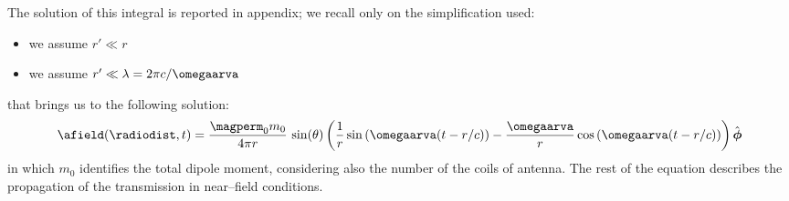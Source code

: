 The solution of this integral is reported in appendix; we recall only on the simplification used:
\begin{itemize}
\item we assume $r' \ll r$
\item we assume $r' \ll \lambda = 2\pi c/\omegaarva$
\end{itemize}
that brings us to the following solution:
\begin{equation}
\label{eq:soluzioneint}
\afield(\radiodist,t) = \dfrac{\magperm_0 m_0}{4\pi r}\,\sin(\theta)\left( \dfrac{1}{r} \sin\left(\omegaarva(t-r/c)\right) - \dfrac{\omegaarva}{r}\cos\left(\omegaarva(t-r/c)\right)\right)\hat{\boldsymbol{\phi}}
\end{equation}
in which $m_0$ identifies the total dipole moment, considering also the number of the coils of antenna. The rest of the equation describes the propagation of the transmission in near--field conditions.

